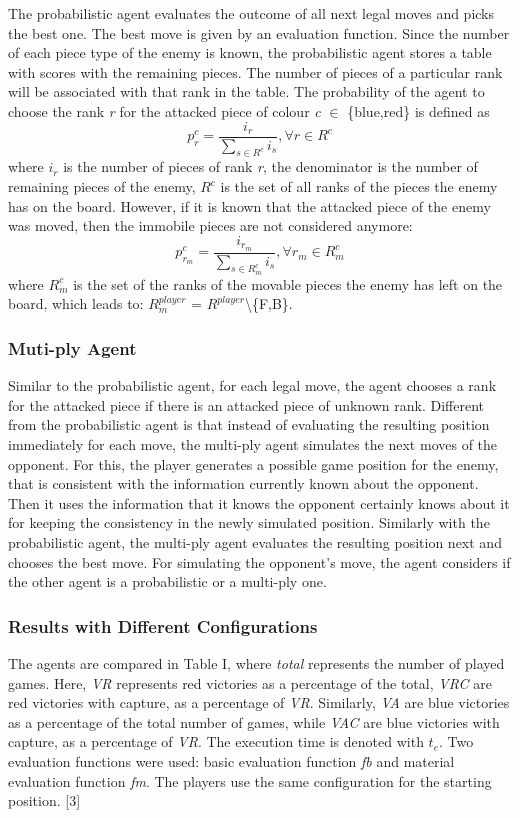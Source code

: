 \documentclass{article}
\begin{document}
The probabilistic agent evaluates the outcome of all next legal moves and picks the best one. 
The best move is given by an evaluation function. Since the number of each piece type of the enemy is known, the probabilistic agent stores a table with scores with the remaining pieces. 
The number of pieces of a particular rank will be associated with that rank in the table. 
The probability of the agent to choose the rank \textit{r} for the attacked piece of colour \textit{c} $\in$ \{blue,red\} is defined as 
$$ p_r^c = \frac{i_r}{\sum_{s \in R^c}{i_s}} , \forall r \in R^c $$ where \textit{$i_r$} is the number of pieces of rank \textit{r}, the denominator is the number of remaining pieces of the enemy, 
\textit{$R^c$} is the set of all ranks of the pieces the enemy has on the board. However, if it is known that the attacked piece of the enemy was moved, then the immobile pieces are not considered anymore: 
$$ p_{r_m}^c = \frac{i_{r_m}}{\sum_{s \in R^c_m}{i_s}} , \forall r_m \in R^c_m $$ where $R^c_m$ is the set of the ranks of the movable pieces the enemy has left on the board, which leads to: $R^{player}_m$ = $R^{player}$\textbackslash\{F,B\}. 

\subsubsection{Muti-ply Agent}

Similar to the probabilistic agent, for each legal move, the agent chooses a rank for the attacked piece if there is an attacked piece of unknown rank. 
Different from the probabilistic agent is that instead of evaluating the resulting position immediately for each move, the multi-ply agent simulates the next moves of the opponent. 
For this, the player generates a possible game position for the enemy, that is consistent with the information currently known about the opponent. 
Then it uses the information that it knows the opponent certainly knows about it for keeping the consistency in the newly simulated position. 
Similarly with the probabilistic agent, the multi-ply agent evaluates the resulting position next and chooses the best move. 
For simulating the opponent’s move, the agent considers if the other agent is a probabilistic or a multi-ply one. 

\subsubsection{Results with Different Configurations}

The agents are compared in Table I, where \textit{total} represents the number of played games. 
Here, \textit{VR} represents red victories as a percentage of the total, \textit{VRC} are red victories with capture, as a percentage of \textit{VR}. 
Similarly, \textit{VA} are blue victories as a percentage of the total number of games, while \textit{VAC} are blue victories with capture, as a percentage of \textit{VR}. 
The execution time is denoted with \textit{$t_e$}. Two evaluation functions were used: basic evaluation function \textit{fb} and material evaluation function \textit{fm}. 
The players use the same configuration for the starting position. [3] 
\end{document}
